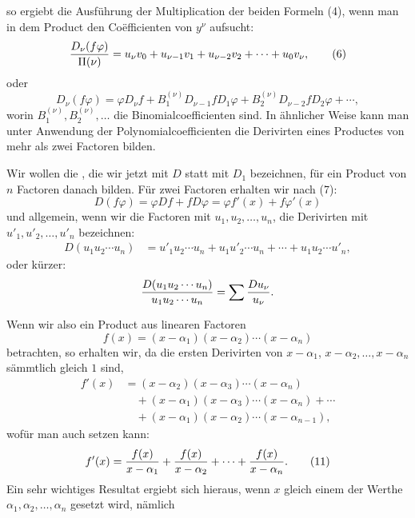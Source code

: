 
so ergiebt die Ausführung der Multiplication der beiden Formeln (4), wenn man in dem Product den Coëfficienten von $y^\nu$ aufsucht:
\begin{equation}
 {D_\nu(f\varphi)\over\Pi(\nu)}
 =u_\nu v_0+u_{\nu-1}v_1+u_{\nu-2}v_2+\cdots+u_0v_\nu,
\tag{6}
\end{equation}
oder
\begin{equation}
 D_\nu(f\varphi)=\varphi D_\nu f+B_1^{(\nu)}D_{\nu-1}fD_1\varphi
 +B_2^{(\nu)}D_{\nu-2}fD_2\varphi+\cdots,
\tag{7}
\end{equation}
worin $B_1^{(\nu)},B_2^{(\nu)},\ldots$ die Binomialcoefficienten sind. In ähnlicher Weise kann man unter Anwendung der Polynomialcoefficienten die Derivirten eines Productes von mehr als zwei Factoren bilden.

Wir wollen die , die wir jetzt mit $D$ statt mit $D_1$ bezeichnen, für ein Product von $n$ Factoren danach bilden. Für zwei Factoren erhalten wir nach (7):
\[
 D(f\varphi)=\varphi Df+fD\varphi=\varphi f'(x)+f\varphi'(x)
\]
und allgemein, wenn wir die Factoren mit $u_1,u_2,\ldots,u_n$, die Derivirten mit $u'_1,u'_2,\ldots,u'_n$ bezeichnen:
\begin{equation}
\begin{aligned}
D(u_1u_2\cdots u_n)
&=u'_1u_2\cdots u_n+u_1u'_2\cdots u_n+\cdots+u_1u_2\cdots u'_n,
\end{aligned}
\tag{8}
\end{equation}
oder kürzer:
\[
 {D(u_1u_2\cdots u_n)\over u_1u_2\cdots u_n}
 =\sum {D u_\nu\over u_\nu}.
\]

Wenn wir also ein Product aus linearen Factoren
\begin{equation}
 f(x)=(x-\alpha_1)(x-\alpha_2)\cdots(x-\alpha_n)
\tag{9}
\end{equation}
betrachten, so erhalten wir, da die ersten Derivirten von $x-\alpha_1$, $x-\alpha_2,\ldots,x-\alpha_n$ sämmtlich gleich $1$ sind,
\begin{equation}
\begin{aligned}
f'(x)&=(x-\alpha_2)(x-\alpha_3)\cdots(x-\alpha_n)\\
&\quad +(x-\alpha_1)(x-\alpha_3)\cdots(x-\alpha_n)+\cdots\\
&\quad +(x-\alpha_1)(x-\alpha_2)\cdots(x-\alpha_{n-1}),
\end{aligned}
\tag{10}
\end{equation}
wofür man auch setzen kann:
\begin{equation}
 f'(x)={f(x)\over x-\alpha_1}+{f(x)\over x-\alpha_2}+\cdots+{f(x)\over x-\alpha_n}.
\tag{11}
\end{equation}
Ein sehr wichtiges Resultat ergiebt sich hieraus, wenn $x$ gleich einem der Werthe $\alpha_1,\alpha_2,\ldots,\alpha_n$ gesetzt wird, nämlich
